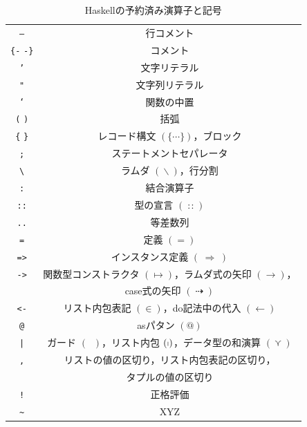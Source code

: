 \documentclass[a5paper,twoside,fleqn,draft]{jsbook}
\newcommand{\programminglanguage}[1]{\textsf{#1}}
\newcommand{\haskell}{\programminglanguage{Haskell}}
\newcommand{\code}[1]{\texttt{#1}}
\DeclareMathOperator{\mSuperClass}{\;\Rightarrow\;}
\DeclareMathOperator{\mDoEq}{\leftarrow}
\DeclareMathOperator{\mFrom}{\in}
\DeclareMathOperator{\mIfSo}{\dashrightarrow}
\DeclareMathOperator{\mIn}{{:\!:}}
\DeclareMathOperator{\mLambda}{\backslash}
\DeclareMathOperator{\mValueOr}{\curlyvee}
\newcommand{\mGuard}[1]{\mathop{\mid_{#1}}}
\DeclareMathOperator{\mListComp}{\shortmid}
\begin{document}
\begin{table}
\caption{\haskell の予約済み演算子と記号}
\label{tab:reserved-symbols}
\begin{center}
\begin{tabular}{||c|c||}
\hline
\code{--}&行コメント\\
\code{\{-} \code{-\}}&コメント\\
\hline
\code{'}&文字リテラル\\
\code{"}&文字列リテラル\\%
\code{`}&関数の中置\\
\code{(} \code{)}&括弧\\
\code{\{} \code{\}}&レコード構文 $(\{\dotsb\})$，ブロック\\
\code{;}&ステートメントセパレータ\\
\hline
\code{\textbackslash}&ラムダ $(\mLambda)$，行分割\\
\code{:}&結合演算子\\
\code{::}&型の宣言 $(\mIn)$\\
\code{..}&等差数列\\
\code{=}&定義 $(=)$\\
\code{=>}&インスタンス定義 $(\mSuperClass)$\\
\code{->}&関数型コンストラクタ $(\mapsto)$，ラムダ式の矢印 $(\rightarrow)$，\\
&case式の矢印 $(\mIfSo)$\\
\code{<-}&リスト内包表記 $(\mFrom)$，do記法中の代入 $(\mDoEq)$\\
\code{@}&asパタン $(@)$\\
\code{|}&ガード $(\mGuard{})$，リスト内包 $(\mListComp)$，データ型の和演算 $(\mValueOr)$\\
\code{,}&リストの値の区切り，リスト内包表記の区切り，\\
&タプルの値の区切り\\
\hline
\code{!}&正格評価\\
\code{\textasciitilde}&XYZ\\
\hline
\end{tabular}
\end{center}
\end{table}
\end{document}
